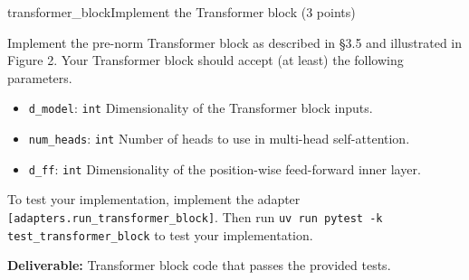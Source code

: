 \begin{problembox}{transformer\_block}{Implement the Transformer block (3 points)}

    Implement the pre-norm Transformer block as described in \S 3.5 and illustrated in Figure 2. Your Transformer block should accept (at least) the following parameters.

    \begin{itemize}[label={}, leftmargin=1.5em, itemsep=0.5em, parsep=0pt, topsep=0.5em]
        \item \texttt{d\_model}: \textcolor{green!50!black}{\texttt{int}} Dimensionality of the Transformer block inputs.
        \item \texttt{num\_heads}: \textcolor{green!50!black}{\texttt{int}} Number of heads to use in multi-head self-attention.
        \item \texttt{d\_ff}: \textcolor{green!50!black}{\texttt{int}} Dimensionality of the position-wise feed-forward inner layer.
    \end{itemize}

    \vspace{0.5em}
    To test your implementation, implement the adapter \textcolor{red!80!black}{\texttt{[adapters.run\_transformer\_block]}}. Then run \texttt{uv run pytest -k test\_transformer\_block} to test your implementation.

    \textbf{Deliverable:} Transformer block code that passes the provided tests.

\end{problembox}

\boxseparator


